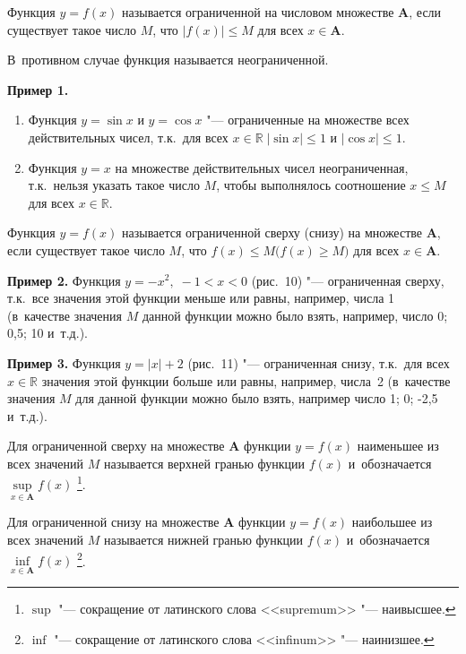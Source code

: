 \begin{Def}
Функция $y = f(x)$ называется ограниченной на числовом множестве $\mathbf{A}$,
если существует такое число $M$, что $|f(x)| \leqslant M$
для всех $x \in \mathbf{A}$.

В~противном случае функция называется неограниченной.
\end{Def}

\textbf{Пример 1.}
\begin{enumerate}
\item Функция $y = \sin x$ и $y = \cos x$ "--- ограниченные на множестве
всех действительных чисел, т.к.\ для всех
$x \in \mathbb{R} \; |\sin x| \leqslant 1$ и $|\cos x| \leqslant 1$.

\item Функция $y = x$ на множестве действительных чисел неограниченная,
т.к.\ нельзя указать такое число $M$, чтобы выполнялось соотношение
$x \leqslant M$ для всех $x \in \mathbb{R}$.
\end{enumerate}

\begin{Def}
Функция $y = f(x)$ называется ограниченной сверху (снизу) на множестве
$\mathbf{A}$, если существует такое число $M$, что
$f(x) \leqslant M \bigl( f(x) \geqslant M \bigr)$ для всех $x \in \mathbf{A}$.
\end{Def}

\textbf{Пример 2.}
Функция $y = -x^{2}, \; -1 < x < 0$ (рис.\ 10) "--- ограниченная сверху,
т.к.\ все значения этой функции меньше или равны, например, числа 1
(в~качестве значения $M$ данной функции можно было взять, например,
число 0; 0{,}5; 10 и~т.д.).

\textbf{Пример 3.}
Функция $y = |x| + 2$ (рис.\ 11) "--- ограниченная снизу,
т.к.\ для всех $x \in \mathbb{R}$ значения этой функции больше или равны,
например, числа~2 (в~качестве значения $M$ для данной функции можно было
взять, например число 1; 0; -2{,}5 и~т.д.).

Для ограниченной сверху на множестве $\mathbf{A}$ функции $y = f(x)$
наименьшее из всех значений $M$ называется верхней гранью функции $f(x)$
и~обозначается $\sup\limits_{x \in \mathbf{A}} f(x)$
\footnote{$\sup$ "--- сокращение от латинского слова <<supremum>>
"--- наивысшее.}.

Для ограниченной снизу на множестве $\mathbf{A}$ функции $y = f(x)$
наибольшее из всех значений $M$ называется нижней гранью функции $f(x)$
и~обозначается $\inf\limits_{x \in \mathbf{A}} f(x)$
\footnote{$\inf$ "--- сокращение от латинского слова <<infinum>>
"--- наинизшее.}.

